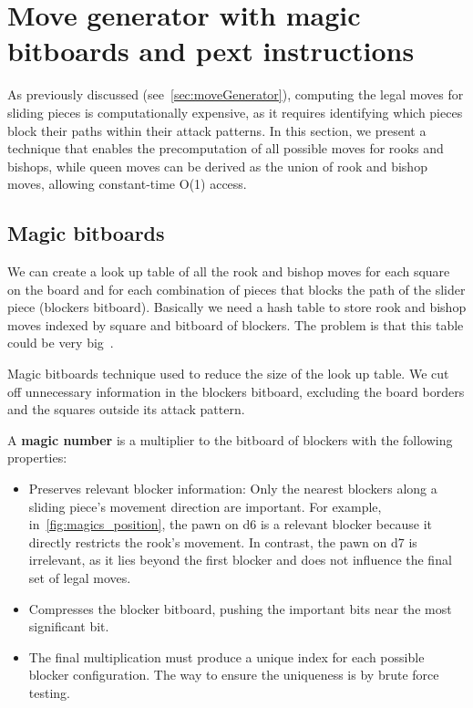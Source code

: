 \section{Move generator with magic bitboards and pext instructions}

As previously discussed (see~\cref{sec:moveGenerator}), computing the legal moves for sliding pieces is computationally expensive, as it requires identifying which pieces block their paths within their attack patterns. In this section, we present a technique that enables the precomputation of all possible moves for rooks and bishops, while queen moves can be derived as the union of rook and bishop moves, allowing constant-time O(1) access.

\subsection*{Magic bitboards}

We can create a look up table of all the rook and bishop moves for each square on the board and for each combination of pieces that blocks the path of the slider piece (blockers  bitboard). Basically we need a hash table to store rook and bishop moves indexed by square and bitboard of blockers. The problem is that this table could be very big~\cite{MagicBitboards}.

\vspace{1em}

\noindent Magic bitboards technique used to reduce the size of the look up table. We cut off unnecessary information in the blockers bitboard, excluding the board borders and the squares outside its attack pattern.

\vspace{1em}

\noindent A \textbf{magic number} is a multiplier to the bitboard of blockers with the following properties:

\begin{itemize}[itemsep=1pt]
  \item Preserves relevant blocker information: 
    Only the nearest blockers along a sliding piece's movement direction are important. For example, in~\cref{fig:magics_position}, the pawn on d6 is a relevant blocker because it directly restricts the rook's movement. In contrast, the pawn on d7 is irrelevant, as it lies beyond the first blocker and does not influence the final set of legal moves.

  \item Compresses the blocker bitboard, pushing the important bits near the most significant bit.
  \item The final multiplication must produce a unique index for each possible blocker configuration. The way to ensure the uniqueness is by brute force testing.
\end{itemize}

